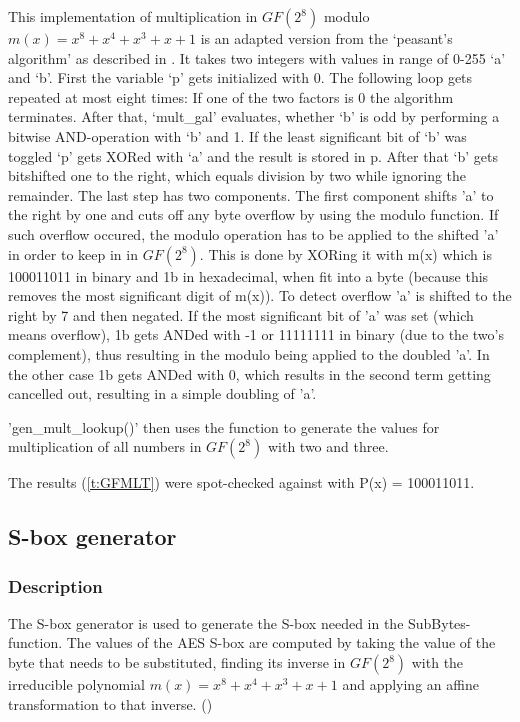 This implementation of multiplication in $GF(2^{8})$ modulo $m(x) = x^8 + x^4 +
x^3 + x + 1$ is an adapted version from the `peasant's algorithm' as
described in
\cite{peasants}.
It takes two integers with values in range of 0-255 `a' and `b'. First
the variable `p' gets initialized with 0. The following loop gets
repeated at most eight times: If one of the two factors is 0 the
algorithm terminates. After that, `mult\_gal' evaluates, whether `b' is
odd by performing a bitwise AND-operation with `b' and 1. If the least
significant bit of `b' was toggled `p' gets XORed with `a' and the
result is stored in p. After that `b' gets bitshifted one to the right,
which equals division by two while ignoring the remainder. The last step
has two components.
The first component shifts 'a' to the right by one and cuts off any byte overflow
by using the modulo function. If such overflow occured, the modulo operation has to be
applied to the shifted 'a' in order to keep in in $GF(2^{8})$. This is done by XORing it
with m(x) which is 100011011 in binary and 1b in hexadecimal, when fit into a byte (because
this removes the most significant digit of m(x)). To detect overflow 'a' is shifted to the right by 7
and then negated. If the most significant bit of 'a' was set (which means overflow), 1b gets ANDed
with -1 or 11111111 in binary (due to the two's complement), thus resulting in the modulo being applied to the doubled 'a'. In the other case 1b gets ANDed with 0, which results in the second term getting cancelled out, resulting in a simple doubling of 'a'.

'gen\_mult\_lookup()' then uses the function to generate the values for
multiplication of all numbers in $GF(2^{8})$ with two and three.

The results (\ref{t:GFMLT}) were spot-checked against
\cite{galcalc} with P(x) = 100011011.

\hypertarget{s-box-generator}{%
\subsection{S-box generator}\label{s-box-generator}}

\hypertarget{description-1}{%
\subsubsection{Description}\label{description-1}}

The S-box generator is used to generate the S-box needed in the
SubBytes-function.
The values of the AES S-box are computed by taking the value of the byte
that needs to be substituted, finding its inverse in $GF(2^{8})$ with the
irreducible polynomial $m(x) = x^8 + x^4 + x^3 + x + 1$ and applying an
affine transformation to that inverse. (\cite[ch 3.4.1]{rijndael})

